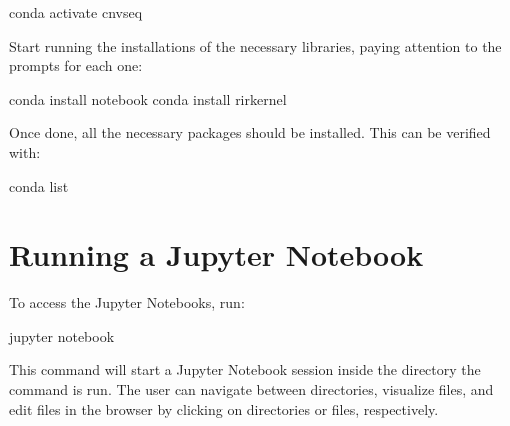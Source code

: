 \documentclass[letterpaper,10pt,english]{sphinxhowto}
\begin{document}
\begin{sphinxVerbatim}[commandchars=\\\{\}]
\PYGZdl{} conda activate cnv\PYGZhy{}seq
\end{sphinxVerbatim}

\sphinxAtStartPar
Start running the installations of the necessary libraries, paying attention to the prompts for each one:

\begin{sphinxVerbatim}[commandchars=\\\{\}]
\PYGZdl{} conda install notebook
\PYGZdl{} conda install r\PYGZhy{}irkernel
\end{sphinxVerbatim}

\sphinxAtStartPar
Once done, all the necessary packages should be installed. This can be verified with:

\begin{sphinxVerbatim}[commandchars=\\\{\}]
\PYGZdl{} conda list
\end{sphinxVerbatim}


\section{Running a Jupyter Notebook}
\label{\detokenize{index:running-a-jupyter-notebook}}
\sphinxAtStartPar
To access the Jupyter Notebooks, run:

\begin{sphinxVerbatim}[commandchars=\\\{\}]
\PYGZdl{} jupyter notebook
\end{sphinxVerbatim}

\sphinxAtStartPar
This command will start a Jupyter Notebook session inside the directory the command is run. The user can navigate between directories, visualize files, and edit files in the browser by clicking on directories or files, respectively.
\end{document}
